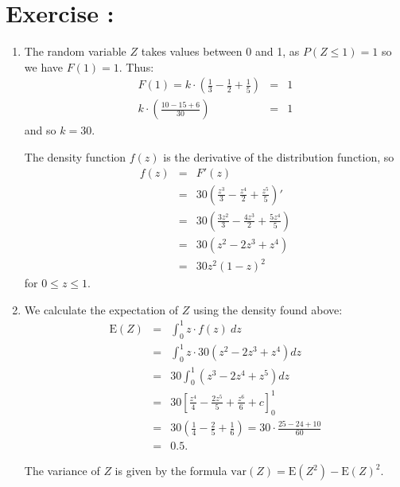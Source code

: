 \documentclass[12pt,thmsa]{article}\usepackage[]{graphicx}\usepackage[]{color}
\begin{document}
\bigskip


\addtocounter{section}{1}
\section*{Exercise \thesection:}

\begin{enumerate}%
\item The random variable $Z$ takes values between 0 and 1, as $P( Z \le 1)=1$ so we have $F(1) = 1$. Thus:
  \begin{eqnarray*}
    F(1) = k \cdot \left( \frac{1}{3}-\frac{1}{2}+\frac{1}{5}\right) &=& 1 \\
    k \cdot \left( \frac{10-15+6}{30} \right)&=& 1%
  \end{eqnarray*}
and so $k = {30}$.

  The density function $f(z)$ is the derivative of the distribution function, so
  \begin{eqnarray*}
    f(z) &=& F'(z) \\
    &=& 30\left(\frac{z^3}{3}-\frac{z^4}{2}+\frac{z^5}{5}\right)' \\
    &=& 30\left(\frac{3z^2}{3}-\frac{4z^3}{2}+\frac{5z^4}{5}\right) \\
    &=& 30\left(z^2 - 2z^3 + z^4\right)\\
    &=& {30z^2(1-z)^2} %
  \end{eqnarray*}
for $0 \le z \le 1$.

\item We calculate the expectation of $Z$ using the density found above:
  \begin{eqnarray*}
    \text{E}(Z) &=& \int_{0}^1 z \cdot f(z) \ dz \\
    &=& \int_0^1 z \cdot 30 (z^2 - 2z^3 + z^4) dz \\
    &=& 30 \int_{0}^1 (z^3 - 2z^4 + z^5) dz \\
    &=& 30 \left[ \frac{z^4}{4} - \frac{2z^5}{5} + \frac{z^6}{6} + c
      \right]^1_0  \\
    &=& 30 \left( \frac{1}{4} - \frac{2}{5} + \frac{1}{6} \right)
    = 30 \cdot \frac{25-24+10}{60} \\
    &=& {0.5}.
  \end{eqnarray*}

 The variance of $Z$ is given by the formula $\text{var}(Z) =
 \text{E}(Z^2) -\text{E}(Z)^2$.


\end{enumerate}
\end{document}
